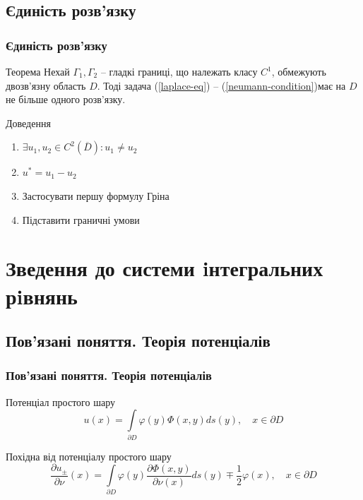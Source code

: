 \documentclass{beamer}
\numberwithin{equation}{section}
\newcommand{\intl}{\int\limits}
\newcommand{\boundprob}{(\ref{laplace-eq}) -- (\ref{neumann-condition})}
\begin{document}
	\subsection{Єдиність розв'язку}
	\begin{frame}
		\frametitle{Єдиність розв'язку}
		
		\begin{block}{Теорема}
			Нехай $\Gamma_{1}, \Gamma_{2}$ -- гладкі границі, що належать класу $C^1$, обмежують двозв'язну область $D$. Тоді задача \boundprob \space має на $D$ не більше одного розв'язку.
		\end{block}
		
		\begin{block}{Доведення}
			\begin{enumerate}
				\item $\exists u_1, u_2 \in C^{2}(\overline{D}): u_1 \neq u_2 $
				\item $u^* = u_1 - u_2$
				\item Застосувати першу формулу Гріна
				\item Підставити граничні умови
			\end{enumerate}
			
		\end{block}

	\end{frame}

	\section{Зведення до системи iнтегральних рiвнянь} 	

	\subsection{Пов'язані поняття. Теорія потенціалів}
	\begin{frame}
		\frametitle{Пов'язані поняття. Теорія потенціалів}
		\begin{block}{Потенціал простого шару}
			$$
			u(x)=\intl_{\partial D} \varphi(y) \Phi(x, y) d s(y), \quad x \in \partial D
			$$
		\end{block}
		\vspace{0.8cm}
		\begin{block}{Похідна від потенціалу простого шару}
			$$
			\frac{\partial u_{\pm}}{\partial \nu}(x) =
			\intl_{\partial D} \varphi(y) \frac{\partial \Phi(x, y)}{\partial \nu(x)} d s(y) \mp \frac{1}{2} \varphi(x),
			\quad x \in \partial D
			$$
		\end{block}
	\end{frame}
\end{document}
